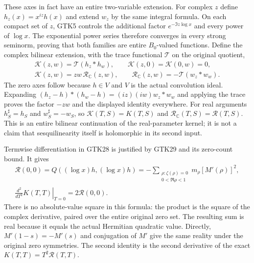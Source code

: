 These axes in fact have an entire two-variable
extension. For complex $z$ define
$h_z(x)=x^{iz}h(x)$ and extend $w_z$
by the same integral formula. On each compact
set of $z$, GTK5 controls the additional
factor $e^{-\Im z\log x}$ and every power of
$\log x$. The exponential power series
therefore converges in every strong seminorm,
proving that both families are entire
$B_0$-valued functions. Define the complex
bilinear extension, with the trace functional
$\mathcal T$ on the original quotient,
\begin{equation}\tag{GTK36c}
 \begin{gathered}
 \mathcal K(z,w)=\mathcal T(h_z*h_w),\qquad
 \mathcal K(z,0)=\mathcal K(0,w)=0,\\
 \mathcal K(z,w)=zw\,\mathcal R_{\mathbb C}(z,w),
 \qquad
 \mathcal R_{\mathbb C}(z,w)=-\mathcal T(w_z*w_w).
 \end{gathered}
\end{equation}
The zero axes follow because $h\in V$ and
$V$ is the actual convolution ideal.
Expanding
$(h_z-h)*(h_w-h)=(iz)(iw)w_z*w_w$
and applying the trace proves the factor
$-zw$ and the displayed identity everywhere.
For real arguments $h_S^\sharp=h_S$ and
$w_S^\sharp=-w_S$, so
$\mathcal K(T,S)=K(T,S)$ and
$\mathcal R_{\mathbb C}(T,S)=\mathcal R(T,S)$.
This is an entire bilinear continuation of
the real-parameter kernel; it is not a
claim that sesquilinearity itself is
holomorphic in its second input.

Termwise differentiation in GTK28 is justified
by GTK29 and its zero-count bound. It gives
\begin{equation}\tag{GTK36d}
 \begin{gathered}
 \mathcal R(0,0)
   =Q((\log x)h,(\log x)h)
   =-\sum_{\substack{\rho:\zeta(\rho)=0\\0<\Re\rho<1}}
                                      m_\rho[M'(\rho)]^2,\\
 \left.\frac{d^2}{dT^2}K(T,T)\right|_{T=0}
                       =2\mathcal R(0,0).
 \end{gathered}
\end{equation}
There is no absolute-value square in this
formula: the product is the square of the
complex derivative, paired over the entire
original zero set. The resulting sum is
real because it equals the actual Hermitian
quadratic value. Directly,
$M'(1-s)=-M'(s)$ and conjugation of $M'$
give the same reality under the original
zero symmetries. The second identity is
the second derivative of the exact
$K(T,T)=T^2\mathcal R(T,T)$.

